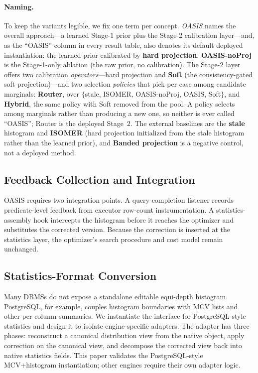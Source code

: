 \documentclass[preprint,12pt]{elsarticle}
\begin{document}
\paragraph{Naming.}
To keep the variants legible, we fix one term per concept. \emph{OASIS} names the
overall approach---a learned Stage-1 prior plus the Stage-2 calibration
layer---and, as the ``OASIS'' column in every result table, also denotes its
default deployed instantiation: the learned prior calibrated by \textbf{hard
projection}. \textbf{OASIS-noProj} is the Stage-1-only ablation (the raw prior,
no calibration). The Stage-2 layer offers two calibration \emph{operators}---hard
projection and \textbf{Soft} (the consistency-gated soft projection)---and two
selection \emph{policies} that pick per case among candidate marginals:
\textbf{Router}, over $\{$stale, ISOMER, OASIS-noProj, OASIS, Soft$\}$, and
\textbf{Hybrid}, the same policy with Soft removed from the pool. A policy selects
among marginals rather than producing a new one, so neither is ever called
``OASIS''; Router is the deployed Stage~2. The external baselines are the
\textbf{stale} histogram and \textbf{ISOMER} (hard projection initialized from the
stale histogram rather than the learned prior), and \textbf{Banded projection} is
a negative control, not a deployed method.

\subsection{Feedback Collection and Integration}
\label{sec:integration}

OASIS requires two integration points. A query-completion listener records
predicate-level feedback from executor row-count instrumentation. A
statistics-assembly hook intercepts the histogram before it reaches the
optimizer and substitutes the corrected version. Because the correction is
inserted at the statistics layer, the optimizer's search procedure and cost
model remain unchanged.

\subsection{Statistics-Format Conversion}
\label{sec:mcv-adapter}

Many DBMSs do not expose a standalone editable equi-depth histogram.
PostgreSQL, for example, couples histogram boundaries with MCV lists and other
per-column summaries. We instantiate the interface for PostgreSQL-style
statistics and design it to isolate engine-specific adapters. The adapter has
three phases: reconstruct a canonical distribution view from the native object,
apply correction on the canonical view, and decompose the corrected view back
into native statistics fields. This paper validates the PostgreSQL-style
MCV+histogram instantiation; other engines require their own adapter logic.
\end{document}
